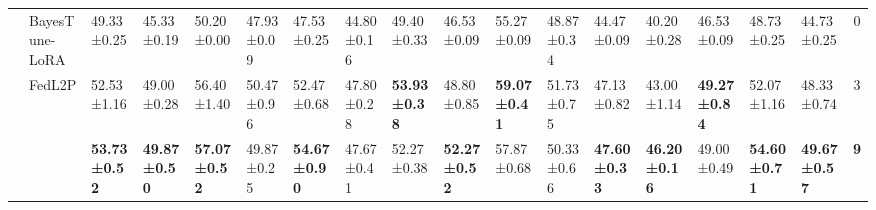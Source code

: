 \begin{table*}[t]
\begin{scriptsize}
{\begin{tabular}{c|l|l|l|l|l|l|l|l|l|l|l|l|l|l|l|l|c}
                    & BayesTune-LoRA                            & 49.33±0.25                       & 45.33±0.19                       & 50.20±0.00                        & 47.93±0.09                       & 47.53±0.25                       & 44.80±0.16                        & 49.40±0.33                        & 46.53±0.09                       & 55.27±0.09                       & 48.87±0.34                       & 44.47±0.09                       & 40.20±0.28                        & 46.53±0.09                       & 48.73±0.25                       & 44.73±0.25                       & 0             \\ %
                    & FedL2P                               & 52.53±1.16                       & 49.00±0.28                        & 56.40±1.40                        & 50.47±0.96                       & 52.47±0.68                       & 47.80±0.28                        & \textbf{53.93±0.38}              & 48.80±0.85                        & \textbf{59.07±0.41}              & 51.73±0.75                       & 47.13±0.82                       & 43.00±1.14                        & \textbf{49.27±0.84}              & 52.07±1.16                       & 48.33±0.74                       & 3             \\ %
                    & \method{}                                 & \textbf{53.73±0.52}              & \textbf{49.87±0.50}              & \textbf{57.07±0.52}              & 49.87±0.25                       & \textbf{54.67±0.90}              & 47.67±0.41                       & 52.27±0.38                       & \textbf{52.27±0.52}              & 57.87±0.68                       & 50.33±0.66                       & \textbf{47.60±0.33}               & \textbf{46.20±0.16}               & 49.00±0.49                        & \textbf{54.60±0.71}               & \textbf{49.67±0.57}              & \textbf{9}    \\ \bottomrule
\end{tabular}
}
\end{scriptsize}
\vspace{-1.5em}
\end{table*}